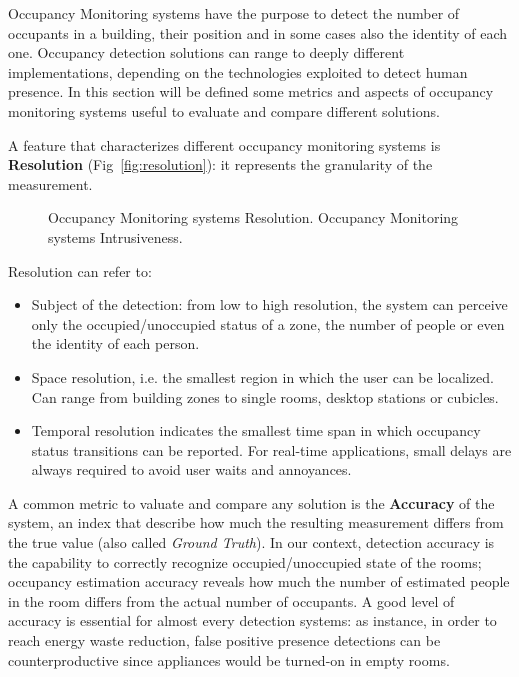 Occupancy Monitoring systems have the purpose to detect the number of occupants in a building, their position and in some cases also the identity of each one.
Occupancy detection solutions can range to deeply different implementations, depending on the technologies exploited to detect human presence. In this section will be defined some metrics and aspects of occupancy monitoring systems useful to evaluate and compare different solutions.

\medskip
A feature that characterizes different occupancy monitoring systems is \textbf{Resolution} (Fig~\ref{fig:resolution}): it represents the granularity of the measurement.

\begin{figure}
\centering
{}
%
\caption[Occupancy Monitoring systems Resolution and Intrusiveness.]{\protect{} Occupancy Monitoring systems Resolution. \protect{} Occupancy Monitoring systems Intrusiveness.}
\label{fig:res_intr}
\end{figure}

Resolution can refer to:
\begin{itemize}
\item Subject of the detection: from low to high resolution, the system can perceive only the occupied/unoccupied status of a zone, the number of people or even the identity of each person.
\item Space resolution, i.e. the smallest region in which the user can be localized. Can range from building zones to single rooms, desktop stations or cubicles.
\item Temporal resolution indicates the smallest time span in which occupancy status transitions can be reported. For real-time applications, small delays are always required to avoid user waits and annoyances.
\end{itemize}

\medskip
A common metric to valuate and compare any solution is the \textbf{Accuracy} of the system, an index that describe how much the resulting measurement differs from the true value (also called \emph{Ground Truth}). In our context, detection accuracy is the capability to correctly recognize occupied/unoccupied state of the rooms; occupancy estimation accuracy reveals how much the number of estimated people in the room differs from the actual number of occupants. A good level of accuracy is essential for almost every detection systems: as instance, in order to reach energy waste reduction, false positive presence detections can be counterproductive since appliances would be turned-on in empty rooms.

